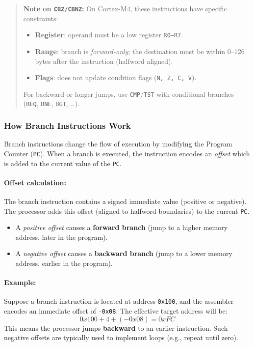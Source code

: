 \begin{quote}
\textbf{Note on \texttt{CBZ/CBNZ}:}
On Cortex-M4, these instructions have specific constraints:
\begin{itemize}[nosep]
  \item \textbf{Register}: operand must be a low register \texttt{R0--R7}.
  \item \textbf{Range}: branch is \emph{forward-only}; the destination must be within 0--126 bytes after the instruction (halfword aligned). 
  \item \textbf{Flags}: does not update condition flags (\texttt{N, Z, C, V}).
\end{itemize}
For backward or longer jumps, use \texttt{CMP}/\texttt{TST} with conditional branches (\texttt{BEQ}, \texttt{BNE}, \texttt{BGT}, \dots).
\end{quote}
\subsubsection{How Branch Instructions Work}

Branch instructions change the flow of execution by modifying the Program Counter (\texttt{PC}). 
When a branch is executed, the instruction encodes an \emph{offset} which is added to the current value of the \texttt{PC}.

\paragraph{Offset calculation:}  
The branch instruction contains a signed immediate value (positive or negative).  
The processor adds this offset (aligned to halfword boundaries) to the current \texttt{PC}.  
\begin{itemize}
    \item A \emph{positive offset} causes a \textbf{forward branch} (jump to a higher memory address, later in the program).  
    \item A \emph{negative offset} causes a \textbf{backward branch} (jump to a lower memory address, earlier in the program).  
\end{itemize} 

\paragraph{Example:}  
Suppose a branch instruction is located at address \texttt{0x100}, and the assembler encodes an immediate offset of \texttt{-0x08}.  
The effective target address will be:
\[
0x100 + 4 + (-0x08) = 0xFC
\]
This means the processor jumps \textbf{backward} to an earlier instruction.  
Such negative offsets are typically used to implement loops (e.g., repeat until zero).



